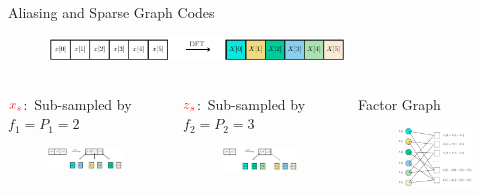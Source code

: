 \documentclass[10pt,xcolor=table]{beamer}
\begin{document}
	\begin{frame}{Aliasing and Sparse Graph Codes}
	
		\begin{block}{}
			\begin{figure}[t]
				\centering
				\includegraphics[width=3.1in]{./Figures/X_DFT}
			\end{figure}
		\end{block}
		
		\begin{columns}
			
			\column{.47\textwidth}
			\begin{block}{{\small $\color{red}x_s$:\ Sub-sampled by $f_1=P_1=2$}}
				\begin{figure}[t]
					\centering
					\includegraphics[width=2.3in]{./Figures/Xs}
				\end{figure}
			\end{block}
			
			\begin{block}{{\small$\color{red}z_s$:\ Sub-sampled by $f_2=P_2=3$}}
				\begin{figure}[t]
					\centering
					\includegraphics[width=2.3in]{./Figures/Zs}
				\end{figure}
			\end{block}
			
			\begin{block}{\small Factor Graph}
				\begin{figure}[t]
					\centering
					\includegraphics[width=2.3in]{./Figures/Factorgraph_example}
				\end{figure}
			\end{block}
		\end{columns}
	\end{frame}
\end{document}
